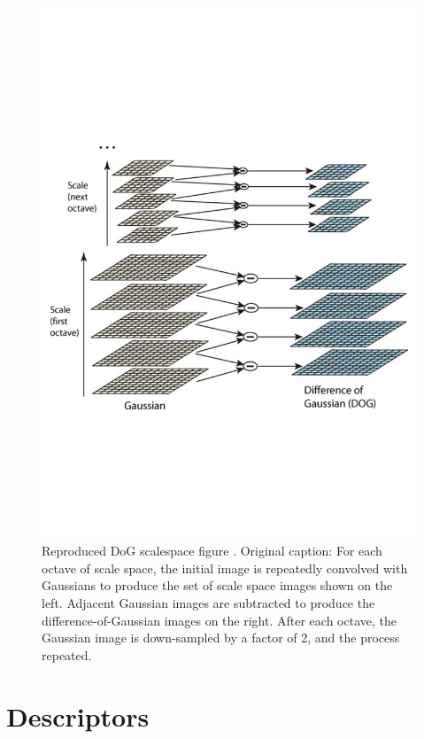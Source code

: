 \documentclass[thesis.tex]{subfiles}
\begin{document}
\begin{figure}[tb]
	\centering
	\includegraphics[width=\textwidth,clip=true,trim=0 200 0 220]{img/SIFT_dogspaces.pdf}
	\caption{Reproduced DoG scalespace figure \cite[figure 1,pp. 95]{lowe2004distinctive}. Original caption: For each octave of scale space, the initial image is repeatedly convolved with Gaussians to produce the set of scale space images
shown on the left. Adjacent Gaussian images are subtracted to produce the difference-of-Gaussian images on the right. After each octave, the
Gaussian image is down-sampled by a factor of 2, and the process repeated.}
	\label{fig:dogSpaces}
\end{figure}

\section{Descriptors}
\end{document}
